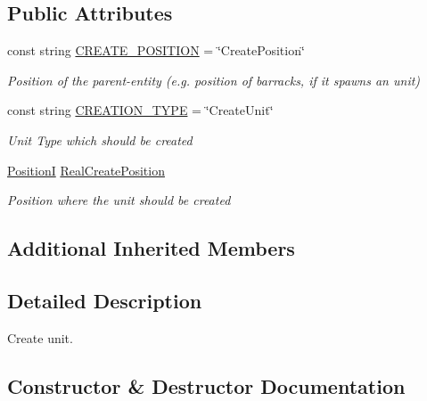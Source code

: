 \subsection*{Public Attributes}
\begin{DoxyCompactItemize}
\item 
const string \hyperlink{classCore_1_1Controllers_1_1Actions_1_1CreateUnit_a35a30a8393a155c7bb8e76ecc8c08874}{C\+R\+E\+A\+T\+E\+\_\+\+P\+O\+S\+I\+T\+I\+O\+N} = \char`\"{}Create\+Position\char`\"{}
\begin{DoxyCompactList}\small\item\em Position of the parent-\/entity (e.\+g. position of barracks, if it spawns an unit) \end{DoxyCompactList}\item 
const string \hyperlink{classCore_1_1Controllers_1_1Actions_1_1CreateUnit_a2df09d9a45946983c9d5d0ee08a0b4a3}{C\+R\+E\+A\+T\+I\+O\+N\+\_\+\+T\+Y\+P\+E} = \char`\"{}Create\+Unit\char`\"{}
\begin{DoxyCompactList}\small\item\em Unit Type which should be created \end{DoxyCompactList}\item 
\hyperlink{classCore_1_1Models_1_1PositionI}{Position\+I} \hyperlink{classCore_1_1Controllers_1_1Actions_1_1CreateUnit_a75330207d1027fb83f97d8973ae355f3}{Real\+Create\+Position}
\begin{DoxyCompactList}\small\item\em Position where the unit should be created \end{DoxyCompactList}\end{DoxyCompactItemize}
\subsection*{Additional Inherited Members}


\subsection{Detailed Description}
Create unit. 



\subsection{Constructor \& Destructor Documentation}
\hypertarget{classCore_1_1Controllers_1_1Actions_1_1CreateUnit_a38e1f619d2ec42c361d1ab532b04b2cb}{}
